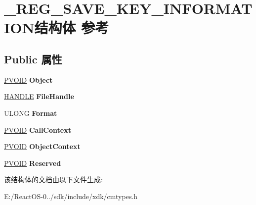 \hypertarget{struct___r_e_g___s_a_v_e___k_e_y___i_n_f_o_r_m_a_t_i_o_n}{}\section{\+\_\+\+R\+E\+G\+\_\+\+S\+A\+V\+E\+\_\+\+K\+E\+Y\+\_\+\+I\+N\+F\+O\+R\+M\+A\+T\+I\+O\+N结构体 参考}
\label{struct___r_e_g___s_a_v_e___k_e_y___i_n_f_o_r_m_a_t_i_o_n}
\subsection*{Public 属性}
\begin{DoxyCompactItemize}
\item 
\mbox{\label{struct___r_e_g___s_a_v_e___k_e_y___i_n_f_o_r_m_a_t_i_o_n_ad54e5355285b5e47905fdd287b3ed5f6}} 
\hyperlink{interfacevoid}{P\+V\+O\+ID} {\bfseries Object}
\item 
\mbox{\label{struct___r_e_g___s_a_v_e___k_e_y___i_n_f_o_r_m_a_t_i_o_n_aa229f970c001f3aef9ed8d75a76e6809}} 
\hyperlink{interfacevoid}{H\+A\+N\+D\+LE} {\bfseries File\+Handle}
\item 
\mbox{\label{struct___r_e_g___s_a_v_e___k_e_y___i_n_f_o_r_m_a_t_i_o_n_a307f6a1477bb3bb38a7cb24a37743180}} 
U\+L\+O\+NG {\bfseries Format}
\item 
\mbox{\label{struct___r_e_g___s_a_v_e___k_e_y___i_n_f_o_r_m_a_t_i_o_n_a372d347c7b1067faa87ced6f6b089913}} 
\hyperlink{interfacevoid}{P\+V\+O\+ID} {\bfseries Call\+Context}
\item 
\mbox{\label{struct___r_e_g___s_a_v_e___k_e_y___i_n_f_o_r_m_a_t_i_o_n_ae29a3cbdc46a7bb3e7ce79dc79fc1c35}} 
\hyperlink{interfacevoid}{P\+V\+O\+ID} {\bfseries Object\+Context}
\item 
\mbox{\label{struct___r_e_g___s_a_v_e___k_e_y___i_n_f_o_r_m_a_t_i_o_n_a1c5ce0d8cd08123e5ad20e29695995c3}} 
\hyperlink{interfacevoid}{P\+V\+O\+ID} {\bfseries Reserved}
\end{DoxyCompactItemize}


该结构体的文档由以下文件生成\+:\begin{DoxyCompactItemize}
\item 
E\+:/\+React\+O\+S-\/0../sdk/include/xdk/cmtypes.\+h\end{DoxyCompactItemize}
